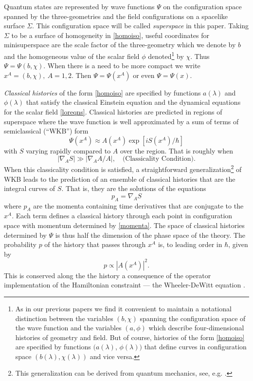 \documentclass[prd,floats,superscriptaddress,eqsecnum,floatfix,nofootinbib,12pt]{revtex4}
\def\ah{a}
\def\phih{\phi}
\def\be{\begin{equation}}
\def\ee{\end{equation}}
\def\jf{}
\def\mf{}
\def\tf{}
\begin{document}
Quantum states are represented by wave functions $\Psi$ on the configuration space spanned by the three-geometries and the field configurations on a spacelike surface $\Sigma$. This configuration space will be called {\it superspace} in this paper. Taking $\Sigma$ to be a surface of homogeneity in \eqref{homoiso}, useful coordinates for minisuperspace are the scale factor of the three-geometry which we denote by $b$ and the homogeneous value of the scalar field $\phi$ denoted\footnote{As in our previous papers we find it convenient to maintain a notational distinction between the variables $(b,\chi)$ spanning the configuration space of the wave function and the variables $(a,\phi)$ which describe four-dimensional histories of geometry and field. But of course, histories of the form \eqref{homoiso} are specified by functions $(\ah(\lambda)$, $\phih(\lambda))$ that define curves in configuration space $(b(\lambda),\chi(\lambda))$ and vice versa.} by $\chi$. Thus $\Psi=\Psi(b,\chi)$. When there is a need to be more compact we write ${x^A} =(b,\chi), \  A=1,2$. Then $\Psi=\Psi(x^A)$ or even $\Psi=\Psi(x)$. 

{\it Classical histories} of the form \eqref{homoiso} are specified by functions $\ah(\lambda)$ and $\phih(\lambda)$ that satisfy the classical Einstein equation and the dynamical equations for the scalar field \eqref{loreqns}. Classical histories are predicted in regions of superspace where the wave function is well approximated by  {\mf a sum of terms of} semiclassical (``WKB'') form
\be
\Psi(x^A) \approx A(x^A) \exp[i S(x^A)/\hbar]
\label{semiclassical-wf}
\ee
with $S$ varying rapidly compared to $A$ over the region. That is roughly when
\be 
\label{classcond}
|\nabla_A S| \gg |\nabla_A A/A|,  \quad \text{(Classicality Condition)}.
\ee
When this classicality condition is satisfied, a straightforward generalization\footnote{This generalization can be derived from quantum mechanics, see, e.g. \cite{Har95c}.} of WKB leads to the prediction of an ensemble of classical histories that are the integral curves of $S$. That is, they are the solutions of the equations 
\be
p_A = \nabla_A S
\label{momenta}
\ee
where $p_A$ are the momenta {\jf containing time derivatives that are conjugate to the $x^A$.} {\mf Each term defines a } classical history through each point in configuration space with momentum determined by \eqref{momenta}. The space of classical histories {\tf determined by $\Psi$} is thus half the dimension of the phase space of the theory. The probability $p$ of the history that passes through $x^A$ is, to leading order in $\hbar$, given by 
\be
\label{probhist1}
p \propto |A(x^A)|^2 .
\ee
This is conserved along the the history a consequence of the operator implementation of the Hamiltonian constraint --- the Wheeler-DeWitt equation \cite{HHH08b}. 
\end{document}
